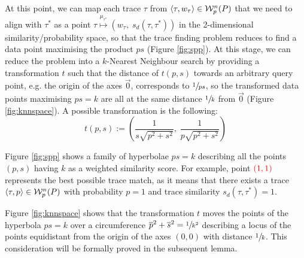 At this point, we can map each trace $\tau$ from $\braket{\tau,w_\tau}\in\mathcal{W}_p^n(P)$ that we need to align with $\tau^*$ as a point $\tau\overset{\mu_{\tau^*}}{\mapsto}(w_\tau,\; s_d(\tau,\tau^*))$ in the 2-dimensional similarity/probability space, so that the trace finding problem reduces to find a data point maximising the product $ps$ (Figure \ref{fig:spp}). At this stage, we can reduce the problem into a $k$-Nearest Neighbour search by providing a transformation $t$ such that the distance of $t(p,s)$ towards an arbitrary query point, e.g. the origin of the axes $\vec{0}$, corresponds to $\sfrac{1}{ps}$, so the transformed data points maximising $ps=k$ are all at the same distance $\sfrac{1}{k}$ from $\vec{0}$ (Figure \ref{fig:knnspace}). A possible transformation is the following:
\[t(p,s):=\left(\frac{1}{s\sqrt{p^2+s^2}},\; \frac{1}{p\sqrt{p^2+s^2}}\right)\]

\begin{example}
Figure \ref{fig:spp} shows a family of hyperbolae $ps=k$ describing all the points $(p,s)$ having $k$ as a weighted similarity score. For example,  point $\color{red}(1,1)$ represents the best possible trace match, as it means that there exists a trace $\braket{\tau,p}\in\mathcal{W}_p^n(P)$ with probability $p=1$ and trace similarity $s_d(\tau,\tau^*)=1$.

Figure \ref{fig:knnspace} shows that the transformation $t$ moves the points of the hyperbola $ps=k$ over a circumference $\overline{p}^2+\overline{s}^2=\sfrac{1}{k^2}$ describing a locus of the points equidistant from the origin of the axes $(0,0)$ with distance $\sfrac{1}{k}$. %
This consideration will be formally proved in the subsequent lemma.
\end{example}

